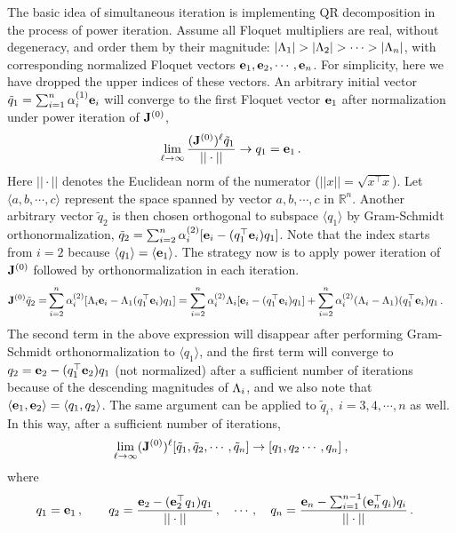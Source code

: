 \documentclass[final,leqno,onefignum,onetabnum]{siamltexmm}
\begin{document}
The basic idea of simultaneous iteration is implementing QR decomposition
in the process of power iteration. Assume all Floquet multipliers
are real, without degeneracy, and order them by their
magnitude: $|\ExpaEig_{1}|>|\ExpaEig_{2}|>\cdots >|\ExpaEig_{n}|$, with
corresponding normalized Floquet vectors
$\jEigvec[1], \jEigvec[2],\cdots, \jEigvec[n]$.
For simplicity, here we have dropped the upper indices of these vectors.
An arbitrary initial vector
$\tilde{q}_{1}=\sum_{i=1}^{n}\alpha^{(1)}_{i}\jEigvec[i]$ will converge to the
first Floquet vector $\jEigvec[1]$ after normalization under power iteration of
$\ps{\jMps}{0}$,
\[
 \lim_{\ell\to \infty }\frac{(\ps{\jMps}{0})^{\ell}\tilde{q}_{1}}{||\cdot||}
 \to q_{1}=\jEigvec[1]
 \,.
\]
Here $||\cdot||$ denotes the Euclidean norm of the numerator
($||x||=\sqrt{x^\top x}$). Let $\langle a,b,\cdots,c\rangle$ represent
the space spanned by vector $a,b,\cdots,c$ in $\mathbb{R}^n$. Another
arbitrary vector $\tilde{q}_{2}$ is then chosen orthogonal to subspace
$\langle q_{1} \rangle$ by Gram-Schmidt orthonormalization,
$\tilde{q}_{2}= \sum_{i=2}^{n}\alpha^{(2)}_{i}[\jEigvec[i]-(q_{1}^\top
\jEigvec[i])q_{1}]$.
Note that the index starts from $i=2$ because $\langle q_{1}
\rangle=\langle \edit{\jEigvec[1]} \rangle$. The strategy now is to apply power
iteration of $\ps{\jMps}{0}$ followed by orthonormalization in each
iteration.
\begin{align*}
  \ps{\jMps}{0}\tilde{q}_{2}= &\sum_{i=2}^{n}\alpha^{(2)}_{i}
  [\ExpaEig_{i}\jEigvec[i]-\ExpaEig_{1}(q_{1}^\top \jEigvec[i])q_1]
  = \sum_{i=2}^{n}\alpha^{(2)}_{i}\ExpaEig_{i}[\jEigvec[i]-
  (q_{1}^\top \jEigvec[i])q_{1}]+\sum_{i=2}^{n}\alpha^{(2)}_{i}
  (\ExpaEig_{i}-\ExpaEig_{1})(q_{1}^\top \jEigvec[i])q_{1}
  \,.
\end{align*}
The second term in the above expression will disappear after performing
Gram-Schmidt orthonormalization to $\langle q_{1} \rangle$, and the first
term will converge to
$q_{2}=\jEigvec[2]-(q_{1}^\top \jEigvec[2])q_{1}$ (not
normalized) after a sufficient number of iterations because of the
descending magnitudes of $\ExpaEig_{i}$, and we also note that $\langle
\edit{\jEigvec[1], \jEigvec[2]} \rangle=\langle q_{1}, q_{2}\rangle$. The same argument can
be applied to $\tilde{q}_{i},\;i=3,4,\cdots,n$ as well.
In this way, after a sufficient number of iterations,
\[
\lim_{\ell\to \infty}(\ps{\jMps}{0})^{\ell}[\tilde{q}_{1},\tilde{q}_{2},\cdots,
\tilde{q}_{n}]
\to [q_{1},q_{2}\cdots, q_{n}]
\:,
\]
where
\[
\begin{aligned}
  & q_{1} = \jEigvec[1]\,,\qquad
    q_{2} = \frac{\jEigvec[2]-(\jEigvec[2]^\top q_{1})q_{1}}{||\cdot ||}\,,
    \quad \cdots\,,\quad
    q_{n} = \frac{\jEigvec[n]-\sum_{i=1}^{n-1}(\jEigvec[n]^\top
      q_{i})q_{i}}{||\cdot ||}
\,.
\end{aligned}
\]
\end{document}
